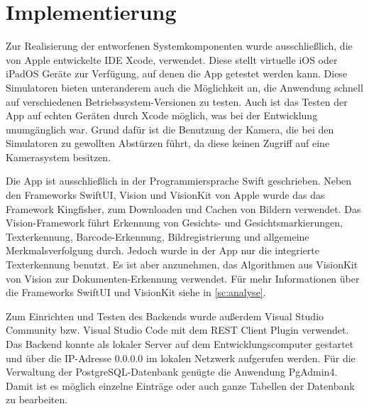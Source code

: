 \documentclass[notables, nomenclature, oneside, 150]{HSMW-Thesis}
\begin{document}
	\section{Implementierung}\label{sc:implementierung}
		Zur Realisierung der entworfenen Systemkomponenten wurde ausschließlich, die von Apple entwickelte IDE Xcode, verwendet. Diese stellt virtuelle iOS oder iPadOS Geräte zur Verfügung, auf denen die App getestet werden kann. Diese Simulatoren bieten unteranderem auch die Möglichkeit an, die Anwendung schnell auf verschiedenen Betriebssystem-Versionen zu testen. Auch ist das Testen der App auf echten Geräten durch Xcode möglich, was bei der Entwicklung unumgänglich war. Grund dafür ist die Benutzung der Kamera, die bei den Simulatoren zu gewollten Abstürzen führt, da diese keinen Zugriff auf eine Kamerasystem besitzen.
		
		Die App ist ausschließlich in der Programmiersprache Swift geschrieben. Neben den Frameworks SwiftUI, Vision und VisionKit von Apple wurde das das Framework Kingfisher, zum Downloaden und Cachen von Bildern verwendet. Das Vision-Framework führt Erkennung von Gesichts- und Gesichtsmarkierungen, Texterkennung, Barcode-Erkennung, Bildregistrierung und allgemeine Merkmalsverfolgung durch. Jedoch wurde in der App nur die integrierte Texterkennung benutzt. Es ist aber anzunehmen, das Algorithmen aus VisionKit von Vision zur Dokumenten-Erkennung verwendet. Für mehr Informationen über die Frameworks SwiftUI und VisionKit siehe in \autoref{sc:analyse}.
		
		Zum Einrichten und Testen des Backends wurde außerdem Visual Studio Community bzw. Visual Studio Code mit dem REST Client Plugin verwendet. Das Backend konnte als lokaler Server auf dem Entwicklungscomputer gestartet und über die IP-Adresse 0.0.0.0 im lokalen Netzwerk aufgerufen werden. Für die Verwaltung der PostgreSQL-Datenbank genügte die Anwendung PgAdmin4. Damit ist es möglich einzelne Einträge oder auch ganze Tabellen der Datenbank zu bearbeiten.
		
\end{document}
